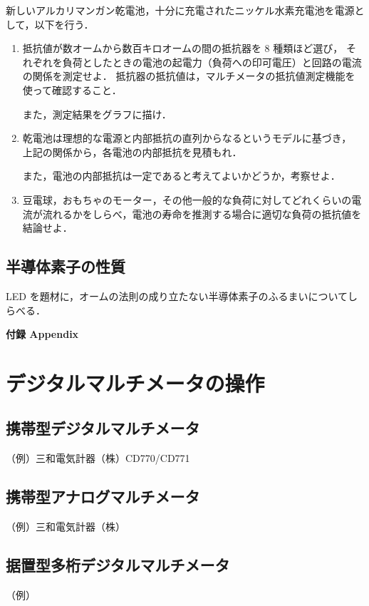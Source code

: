\documentclass[11pt,sort]{jarticle}
\begin{document}
新しいアルカリマンガン乾電池，十分に充電されたニッケル水素充電池を電源として，以下を行う．
\begin{enumerate}
\item
抵抗値が数オームから数百キロオームの間の抵抗器を 8 種類ほど選び，
それぞれを負荷としたときの電池の起電力（負荷への印可電圧）と回路の電流の関係を測定せよ．
抵抗器の抵抗値は，マルチメータの抵抗値測定機能を使って確認すること．

また，測定結果をグラフに描け．
\item
乾電池は理想的な電源と内部抵抗の直列からなるというモデルに基づき，
上記の関係から，各電池の内部抵抗を見積もれ．

また，電池の内部抵抗は一定であると考えてよいかどうか，考察せよ．
\item
豆電球，おもちゃのモーター，その他一般的な負荷に対してどれくらいの電流が流れるかをしらべ，電池の寿命を推測する場合に適切な負荷の抵抗値を結論せよ．
\end{enumerate}

\subsection{半導体素子の性質}\label{b}

LED を題材に，オームの法則の成り立たない半導体素子のふるまいについてしらべる．





\newpage
\appendix
\noindent
{\LARGE\bf 付録 Appendix}

\section{デジタルマルチメータの操作}

\subsection{携帯型デジタルマルチメータ}
（例）三和電気計器（株）CD770/CD771

\subsection{携帯型アナログマルチメータ}
（例）三和電気計器（株）

\subsection{据置型多桁デジタルマルチメータ}
（例）
\end{document}
